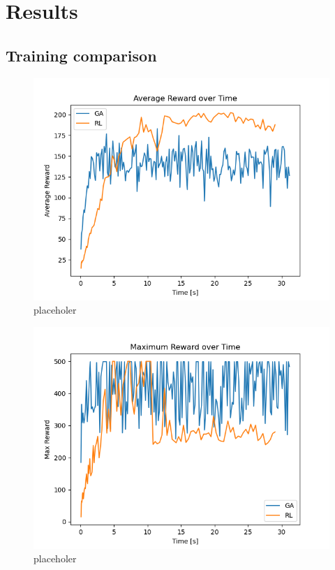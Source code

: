 \section{Results}

\subsection{Training comparison}
\begin{figure}[H]
	\centering
	\includegraphics [scale = 0.5]{Images/RL_GA_comparison_avg.png}
	\caption{placeholer}
	\label{figAVG}
\end{figure}

\begin{figure}[H]
	\centering
	\includegraphics [scale = 0.5]{Images/RL_GA_comparison_max.png}
	\caption{placeholer}
	\label{figMAX}
\end{figure}



